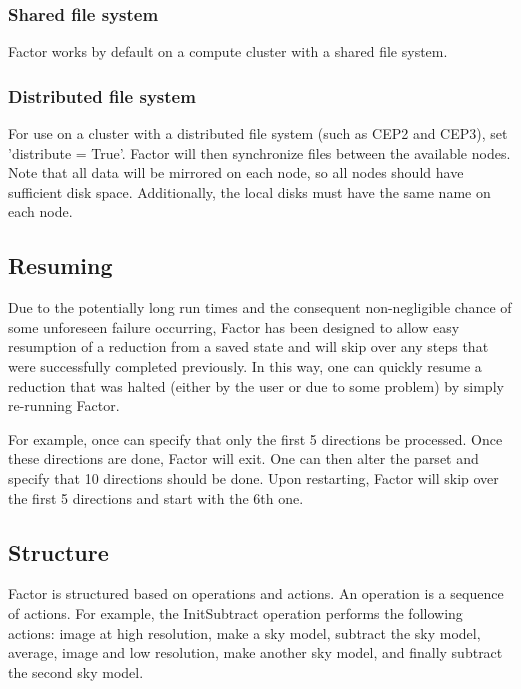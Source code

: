 \documentclass[structabstract]{article}
\begin{document}
{\subsubsection{Shared file system}
Factor works by default on a compute cluster with a shared file system.

\subsubsection{Distributed file system}
For use on a cluster with a distributed file system (such as CEP2 and CEP3), set
'distribute = True'. Factor will then synchronize files between the available
nodes. Note that all data will be mirrored on each node, so all nodes should
have sufficient disk space. Additionally, the local disks must have the same
name on each node.


\subsection{Resuming}
\label{factor:resuming}

Due to the potentially long run times and the consequent non-negligible chance
of some unforeseen failure occurring, Factor has been designed to allow easy
resumption of a reduction from a saved state and will skip over any steps that
were successfully completed previously. In this way, one can quickly resume a
reduction that was halted (either by the user or due to some problem) by simply
re-running Factor.

For example, once can specify that only the first 5 directions be processed.
Once these directions are done, Factor will exit. One can then alter the parset
and specify that 10 directions should be done. Upon restarting, Factor will skip
over the first 5 directions and start with the 6th one.


\subsection{Structure}
\label{factor:structure}

Factor is structured based on operations and actions. An operation is a sequence of actions. For example, the InitSubtract operation performs the following actions: image at high resolution, make a sky model, subtract the sky model, average, image and low resolution, make another sky model, and finally subtract the second sky model.

}
\end{document}
